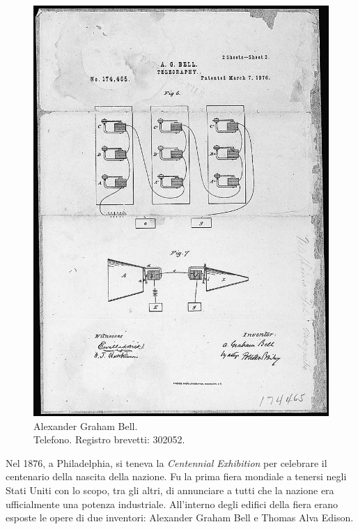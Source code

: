 \begin{refsection}
\begin{figure}[th!]
\centering
\includegraphics[width=0.99\columnwidth]{CAPITOLI/0200/img/telephone-patent-drawing-l.jpg}
\caption[]{Alexander Graham Bell.\\ Telefono. Registro brevetti: 302052.}
\label{agb:tel}
\end{figure}

Nel 1876, a Philadelphia, si teneva la \emph{Centennial Exhibition} per celebrare
il centenario della nascita della nazione. Fu la prima fiera mondiale a tenersi
negli Stati Uniti con lo scopo, tra gli altri, di annunciare a tutti che la nazione era
ufficialmente una potenza industriale. All'interno degli edifici della fiera erano
esposte le opere di due inventori: Alexander Graham Bell e Thomas Alva Edison.


\end{refsection}
